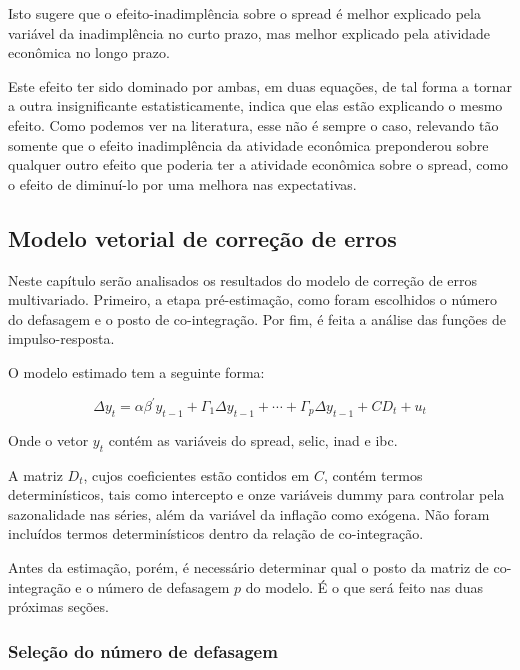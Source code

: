 \documentclass[a4paper,
               article,
               12pt,
               openany,
               oneside,
               english,
               brazil]{abntex2}
\numberwithin{equation}{section}
\begin{document}
    Isto sugere que o efeito-inadimplência sobre o spread é melhor explicado pela variável da inadimplência no curto prazo, mas melhor explicado pela atividade econômica no longo prazo.
    
    Este efeito ter sido dominado por ambas, em duas equações, de tal forma a tornar a outra insignificante estatisticamente, indica que elas estão explicando o mesmo efeito. Como podemos ver na literatura, esse não é sempre o caso, relevando tão somente que o efeito inadimplência da atividade econômica preponderou sobre qualquer outro efeito que poderia ter a atividade econômica sobre o spread, como o efeito de diminuí-lo por uma melhora nas expectativas.

    \subsection{Modelo vetorial de correção de erros}

    Neste capítulo serão analisados os resultados do modelo de correção de erros multivariado. Primeiro, a etapa pré-estimação, como foram escolhidos o número do defasagem e o posto de co-integração. Por fim, é feita a análise das funções de impulso-resposta.

    O modelo estimado tem a seguinte forma:

    \begin{equation}
        \Delta y_t = \alpha \beta^{'} y_{t-1}+ \Gamma_1 \Delta y_{t-1} + \cdots + \Gamma_{p} \Delta y_{t-1} + CD_t + u_t \label{vecm_spread}
    \end{equation}

    Onde o vetor $ y_t $ contém as variáveis do spread, selic, inad e ibc.
    
    A matriz $ D_t $, cujos coeficientes estão contidos em $ C $, contém termos determinísticos, tais como intercepto e onze variáveis dummy para controlar pela sazonalidade nas séries, além da variável da inflação como exógena. Não foram incluídos termos determinísticos dentro da relação de co-integração.

    Antes da estimação, porém, é necessário determinar qual o posto da matriz de co-integração e o número de defasagem $ p $ do modelo. É o que será feito nas duas próximas seções.

    \subsubsection{Seleção do número de defasagem}
\end{document}
